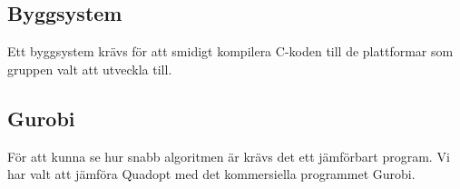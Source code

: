 \begin{LIPSaktivitetslista}
\end{LIPSaktivitetslista}

\subsection{Byggsystem}
Ett byggsystem krävs för att smidigt kompilera C-koden till de plattformar som gruppen valt att utveckla till.
\begin{LIPSaktivitetslista}
\end{LIPSaktivitetslista}

\subsection{Gurobi}
För att kunna se hur snabb algoritmen är krävs det ett jämförbart program. Vi har valt att jämföra Quadopt med det kommersiella programmet Gurobi.
\begin{LIPSaktivitetslista}
\end{LIPSaktivitetslista}
